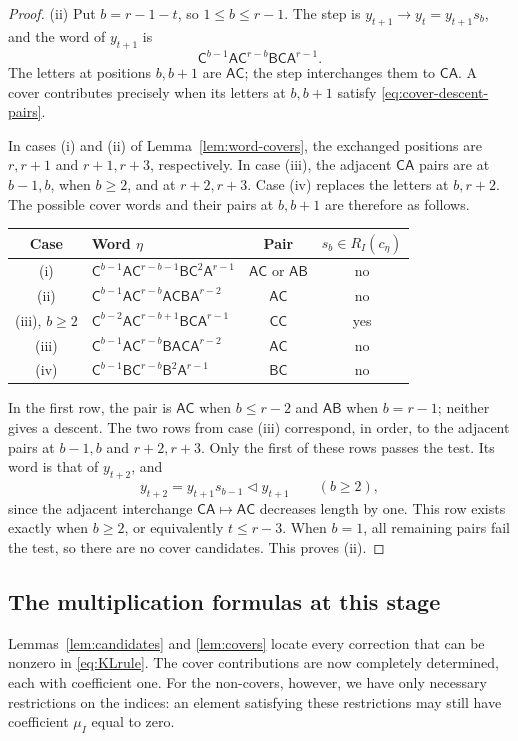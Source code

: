 \documentclass[11pt,a4paper,reqno]{amsart}
\numberwithin{equation}{section}
\theoremstyle{definition}
\theoremstyle{remark}
\theoremstyle{plain}
\newcommand{\A}{\mathsf A}
\newcommand{\B}{\mathsf B}
\newcommand{\CC}{\mathsf C}
\newcommand{\mus}{\mu_I}
\begin{document}
\begin{proof}
\smallskip\noindent
\textup{(ii)} Put $b=r-1-t$, so $1\leq b\leq r-1$.
The step is $y_{t+1}\to y_t=y_{t+1}s_b$, and the word of
$y_{t+1}$ is
\[
 \CC^{b-1}\A\CC^{r-b}\B\CC\A^{r-1}.
\]
The letters at positions $b,b+1$ are $\A\CC$; the step
interchanges them to $\CC\A$. A cover contributes precisely
when its letters at $b,b+1$ satisfy
\eqref{eq:cover-descent-pairs}.

In cases \textup{(i)} and \textup{(ii)} of
Lemma~\ref{lem:word-covers}, the exchanged positions are
$r,r+1$ and $r+1,r+3$, respectively.
In case \textup{(iii)}, the adjacent $\CC\A$ pairs are at
$b-1,b$, when $b\geq2$, and at $r+2,r+3$.
Case \textup{(iv)} replaces the letters at $b,r+2$.
The possible cover words and their pairs at $b,b+1$ are therefore
as follows.
\begin{center}
\begin{tabular}{@{}clcc@{}}
\toprule
Case & Word $\eta$ & Pair & $s_b\in R_I(c_\eta)$ \\
\midrule
\textup{(i)}
 & $\CC^{b-1}\A\CC^{r-b-1}\B\CC^2\A^{r-1}$
 & $\A\CC$ or $\A\B$ & no \\
\textup{(ii)}
 & $\CC^{b-1}\A\CC^{r-b}\A\CC\B\A^{r-2}$ & $\A\CC$ & no \\
\textup{(iii)}, $b\geq2$
 & $\CC^{b-2}\A\CC^{r-b+1}\B\CC\A^{r-1}$ & $\CC\CC$ & yes \\
\textup{(iii)}
 & $\CC^{b-1}\A\CC^{r-b}\B\A\CC\A^{r-2}$ & $\A\CC$ & no \\
\textup{(iv)}
 & $\CC^{b-1}\B\CC^{r-b}\B^2\A^{r-1}$ & $\B\CC$ & no \\
\bottomrule
\end{tabular}
\end{center}
In the first row, the pair is $\A\CC$ when $b\leq r-2$ and
$\A\B$ when $b=r-1$; neither gives a descent.
The two rows from case \textup{(iii)} correspond, in order,
to the adjacent pairs at $b-1,b$ and $r+2,r+3$.
Only the first of these rows passes the test. Its word is that
of $y_{t+2}$, and
\[
 y_{t+2}=y_{t+1}s_{b-1}\triangleleft y_{t+1}\qquad(b\geq2),
\]
since the adjacent interchange $\CC\A\mapsto\A\CC$ decreases
length by one. This row exists exactly when $b\geq2$, or
equivalently $t\leq r-3$. When $b=1$, all remaining pairs fail
the test, so there are no cover candidates. This proves
\textup{(ii)}.
\end{proof}

\subsection{The multiplication formulas at this stage}
\label{sec:candidate-expansions}
Lemmas~\ref{lem:candidates} and \ref{lem:covers} locate every
correction that can be nonzero in \eqref{eq:KLrule}. The cover
contributions are now completely determined, each with coefficient one.
For the non-covers, however, we have only necessary restrictions on the
indices: an element satisfying these restrictions may still have
coefficient $\mus$ equal to zero.
\end{document}
